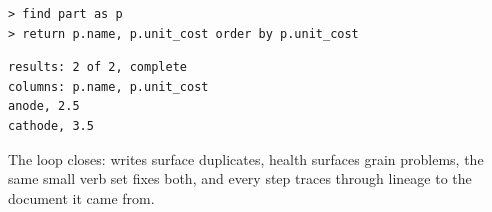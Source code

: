 \documentclass[11pt]{article}
\begin{document}
\begin{lstlisting}[style=gl]
> find part as p
> return p.name, p.unit_cost order by p.unit_cost
\end{lstlisting}
\begin{lstlisting}[style=res]
results: 2 of 2, complete
columns: p.name, p.unit_cost
anode, 2.5
cathode, 3.5
\end{lstlisting}

The loop closes: writes surface duplicates, health surfaces grain problems, the same small verb set fixes both, and every step traces through lineage to the document it came from.
\end{document}
